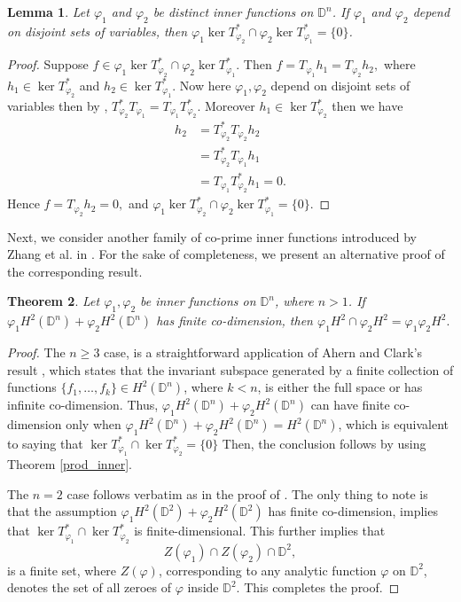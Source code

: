 \documentclass[12pt, a4 paper]{amsart}
\newcommand{\D}{\mathbb{D}}
\theoremstyle{definition}
\theoremstyle{plain}
\newtheorem{thm}{Theorem}[section]
\newtheorem{lem}[thm]{Lemma}
\theoremstyle{definition}
\numberwithin{equation}{section}
\let\phi=\varphi
\begin{document}
 
\begin{lem}
Let $\phi_1$ and $\phi_2$ be distinct inner functions on $\mathbb{D}^n$. If $\phi_1$ and $\phi_2$ depend on disjoint sets of variables, then $\phi_1 \ker T_{\phi_2}^* \cap \phi_2 \ker  T_{\phi_1}^*=\{0\}$.
\end{lem}    
\begin{proof}
Suppose $f\in \phi_1 \ker T_{\phi_2}^* \cap \phi_2 \ker T_{\phi_1}^*. $ Then $f=T_{\phi_1}h_1=T_{\phi_2}h_2,$ where $h_1\in\ker T_{\phi_2}^*$ and $h_2\in \ker T_{\phi_1}^*$. Now here $\phi_1,\phi_2$ depend on disjoint sets of variables then by \cite[Corollary 2]{Gu}, $T^*_{\phi_2}T_{\phi_1}=T_{\phi_1}T^*_{\phi_2}$. Moreover $h_1\in \ker T^*_{\phi_2}$ then we have 
\begin{align*}
h_2&=T^*_{\phi_2}T_{\phi_2}h_2\\&=T^*_{\phi_2}T_{\phi_1}h_1\\&=T_{\phi_1}T^*_{\phi_2}h_1=0.
\end{align*}
 Hence $f=T_{\phi_2}h_2=0,$ and $\phi_1 \ker T_{\phi_2}^* \cap \phi_2 \ker T^*_{\phi_1}=\{0\}$.
\end{proof} 
Next, we consider another family of co-prime inner functions introduced by Zhang et al. in \cite{ZTLYZ}. For the sake of completeness, we present an alternative proof of the corresponding result.
\begin{thm}\label{co-primes}
Let $\phi_1, \phi_2$ be inner functions on $\D^n$, where $n>1$. If $\phi_1 H^2(\D^n) + \phi_2 H^2(\D^n)$ has finite co-dimension, then $\phi_1H^2\cap\phi_2H^2=\phi_1\phi_2H^2.$
\end{thm}
\begin{proof}
The $n \geq 3$ case, is a straightforward application of Ahern and Clark's result \cite[Corollary]{AC}, which states that the invariant subspace generated by a finite collection of functions $\{f_1, \ldots, f_k\} \in H^2(\D^n)$, where $k<n$, is either the full space or has infinite co-dimension. Thus, $\phi_1 H^2(\D^n) + \phi_2 H^2(\D^n)$ can have finite co-dimension only when $\phi_1 H^2(\D^n) + \phi_2 H^2(\D^n) = H^2(\D^n)$, which is equivalent to saying that $\ker T_{\phi_1}^* \cap \ker T_{\phi_2}^* = \{0\}$ Then, the conclusion follows by using Theorem \ref{prod_inner}. 

The $n=2$ case follows verbatim as in the proof of \cite[Theorem 3.5]{GW}. The only thing to note is that the assumption $\phi_1 H^2(\D^2) + \phi_2 H^2(\D^2)$ has finite co-dimension, implies that $\ker T_{\phi_1}^* \cap \ker T_{\phi_2}^*$ is finite-dimensional. This further implies that 
\[
Z(\phi_1) \cap Z(\phi_2) \cap \D^2,
\]
is a finite set, where $Z(\phi)$, corresponding to any analytic function $\phi$ on $\D^2$, denotes the set of all zeroes of $\phi$ inside $\D^2$. This completes the proof.
\end{proof}
\end{document}

